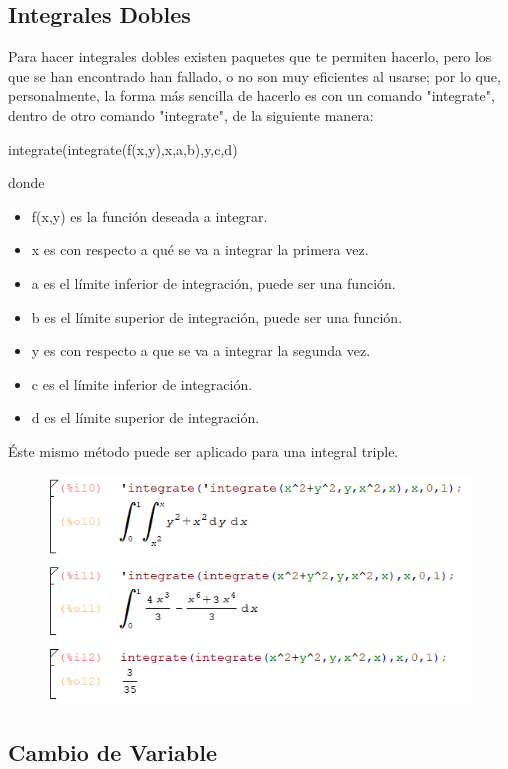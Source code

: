 \documentclass[a4paper]{article}
\begin{document}
\subsection{Integrales Dobles}

Para hacer integrales dobles existen paquetes que te permiten hacerlo, pero los que se han encontrado han fallado, o no son muy eficientes al usarse; por lo que, personalmente, la forma más sencilla de hacerlo es con un comando "integrate", dentro de otro comando "integrate", de la siguiente manera:
\begin{center}
integrate(integrate(f(x,y),x,a,b),y,c,d)
\end{center}
donde
\begin{itemize}
\item f(x,y) es la función deseada a integrar.
\item x es con respecto a qué se va a integrar la primera vez. 
\item a es el límite inferior de integración, puede ser una función.
\item b es el límite superior de integración, puede ser una función.
\item y es con respecto a que se va a integrar la segunda vez.
\item c es el límite inferior de integración.
\item d es el límite superior de integración.
\end{itemize}

Éste mismo método puede ser aplicado para una integral triple.

\begin{figure}[h!]
  \centering
  \includegraphics[width=0.6\linewidth]{dblint_ej.PNG}
\end{figure}

\subsection{Cambio de Variable}
\end{document}
